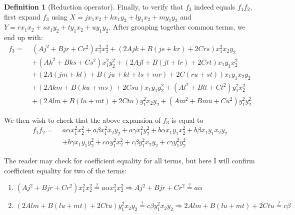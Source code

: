\documentclass{article}
\theoremstyle{definition}
\newtheorem{definition}{Definition}[section]
\theoremstyle{theorem}
\theoremstyle{example}
\theoremstyle{corollary}
\begin{document}
\begin{definition}[Reduction operator]
\bigskip

Finally, to verify that \(f_{3}\) indeed equals \(f_{1} f_{2}\), first expand \(f_{3}\) using \(X = j x_{1} x_{2} + k x_{1} y_{2} + l y_{1} x_{2} + m y_{1} y_{2}\) and \(Y = r x_{1} x_{2} + s x_{1} y_{2} + t y_{1} x_{2} + u y_{1} y_{2}\). After grouping together common terms, we end up with:
\begin{align*}
f_{3} = \, \, & (A j^{2} + B j r + C r^{2}) x_{1}^{2} x_{2}^{2} + (2 A j k + B (j s + k r) + 2 C r s) x_{1}^{2} x_{2} y_{2} \\
& + (A k^{2} + B k s + C s^{2}) x_{1}^{2} y_{2}^{2} + (2 A j l + B (j t + l r) + 2 C r t) x_{1} y_{1} x_{2}^{2} \\
&+ (2 A (j m + k l) + B ( j u + k t + l s + m r) + 2 C (r u + s t)) x_{1} y_{1} x_{2} y_{2} \\
&+ (2 A k m + B (k u + m s) + 2 C s u) x_{1} y_{1} y_{2}^{2} + (A l^{2} + B l t + C t^{2}) y_{1}^{2} x_{2}^{2} \\
&+ (2 A l m + B (l u + m t) + 2 C t u) y_{1}^{2} x_{2} y_{2} + (A m^{2} + B m u + C u^{2}) y_{1}^{2} y_{2}^{2}
\end{align*}

\bigskip

We then wish to check that the above expansion of \(f_{3}\) is equal to
\begin{align*}
f_{1} f_{2} = \, \, & a \alpha x_{1}^{2} x_{2}^{2} + a \beta x_{1}^{2} x_{2} y_{2} + a \gamma x_{1}^{2} y_{2}^{2} + b \alpha x_{1} y_{1} x_{2}^{2} + b \beta x_{1} y_{1} x_{2} y_{2} \\
&+ b \gamma x_{1} y_{1} y_{2}^{2} + c \alpha y_{1}^{2} x_{2}^{2} + c \beta y_{1}^{2} x_{2} y_{2} + c \gamma y_{1}^{2} y_{2}^{2}
\end{align*}

\bigskip

The reader may check for coefficient equality for all terms, but here I will confirm coefficient equality for two of the terms:
\begin{enumerate}
\item \((A j^{2} + B j r + C r^{2}) x_{1}^{2} x_{2}^{2} \stackrel{?}{=} a \alpha x_{1}^{2} x_{2}^{2} \Rightarrow A j^{2} + B j r + C r^{2} \stackrel{?}{=} a \alpha\)
\item \((2 A l m + B (l u + m t) + 2 C t u) y_{1}^{2} x_{2} y_{2} \stackrel{?}{=} c \beta y_{1}^{2} x_{2} y_{2} \Rightarrow 2 A l m + B (l u + m t) + 2 C t u \stackrel{?}{=} c \beta\)
\end{enumerate}


\end{definition}
\end{document}
